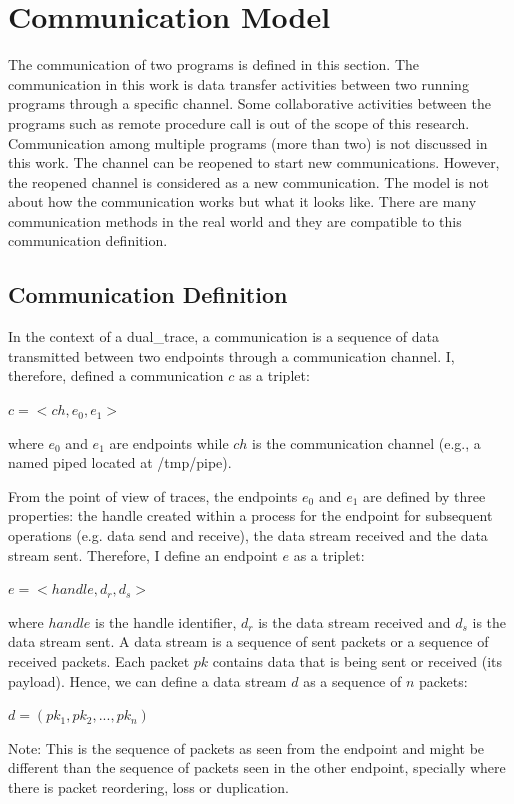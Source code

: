 \section{Communication Model}\label{definition}
The communication of two programs is defined in this section. The communication in this work is data transfer activities between two running programs through a specific channel. Some collaborative activities between the programs such as remote procedure call is out of the scope of this research. Communication among multiple programs (more than two) is not discussed in this work. The channel can be reopened to start new communications. However, the reopened channel is considered as a new communication. The model is not about how the communication works but what it looks like. There are many communication methods in the real world and they are compatible to this communication definition. 

\subsection{Communication Definition}
In the context of a dual\_trace, a communication is a sequence of data transmitted between two endpoints through a communication channel. I, therefore, defined a communication $c$ as a triplet:

$c =<ch, e_0, e_1>$

where $e_0$ and $e_1$ are endpoints while $ch$ is the communication channel (e.g., a named piped located at /tmp/pipe).

From the point of view of traces, the endpoints $e_0$ and $e_1$ are defined by three properties: the handle created within a process for the endpoint for subsequent operations (e.g. data send and receive), the data stream received and the data stream sent. Therefore, I define an endpoint $e$ as a triplet:

$ e =<handle, d_r, d_s>$

where $handle$ is the handle identifier, $d_r$ is the data stream received and $d_s$ is the data stream sent. A data stream is a sequence of sent packets or a sequence of received packets. Each packet $pk$ contains data that is being sent or received (its payload). Hence, we can define a data stream $d$ as a sequence of $n$ packets:

$ d = (pk_1, pk_2, ..., pk_n)$ 

Note: This is the sequence of packets as seen from the endpoint and might be different than the sequence of packets seen in the other endpoint, specially where there is packet reordering, loss or duplication.

